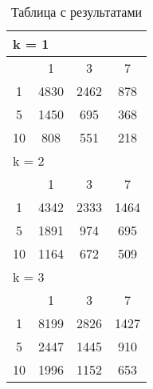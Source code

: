\begin{table}
\label{sphere_results}
  \centering
\begin{tabular}{|*4{c|}}
\hline
\multicolumn{4}{|l|}{k = 1} \\
\hline
\diagbox{$\mu$}{$\lambda$} & \multicolumn{1}{c|}{1} & \multicolumn{1}{c|}{3} & \multicolumn{1}{c|}{7} \\
\hline
1 & 4830 & 2462 & 878 \\
\hline
5 & 1450 & 695 & 368 \\
\hline
10 & 808 & 551 & 218 \\
\hline
\multicolumn{4}{|l|}{k = 2} \\
\hline
\diagbox{$\mu$}{$\lambda$} & \multicolumn{1}{c|}{1} & \multicolumn{1}{c|}{3} & \multicolumn{1}{c|}{7} \\
\hline
1 & 4342 & 2333 & 1464 \\
\hline
5 & 1891 & 974 & 695 \\
\hline
10 & 1164 & 672 & 509 \\
\hline
\multicolumn{4}{|l|}{k = 3} \\
\hline
\diagbox{$\mu$}{$\lambda$} & \multicolumn{1}{c|}{1} & \multicolumn{1}{c|}{3} & \multicolumn{1}{c|}{7} \\
\hline
1 & 8199 & 2826 & 1427 \\
\hline
5 & 2447 & 1445 & 910 \\
\hline
10 & 1996 & 1152 & 653 \\
\hline
\end{tabular}
  \captionsetup{justification=centering}
    \caption{Таблица с результатами}
\end{table}

